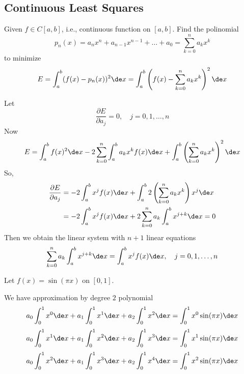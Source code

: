 \subsection{Continuous Least Squares}

\begin{definition}
    Given $f \in C[a,b]$, i.e., continuous function on $[a,b]$. Find the polinomial \[
        p_n(x) = a_n x^n + a_{n-1} x^{n-1} + \dots + a_0 = \sum_{k=0}^n a_k x^k
    \]
    to minimize \[
        E = \int_a^b (f(x) - p_n(x))^2 \de x = \int_a^b \left(f(x) - \sum_{k=0}^n a_k x^k\right)^2 \de x
    \]
\end{definition}

Let \[
    \frac{\partial E}{\partial a_j} = 0, \quad j=0,1,\dots,n
\]
Now \[
    E = \int_a^b f(x)^2 \de x - 2 \sum_{k=0}^n \int_a^b a_k x^k f(x) \de x + \int_a^b \left(\sum_{k=0}^n a_k x^k\right)^2 \de x
\]
So, \begin{align*}
    \frac{\partial E}{\partial a_j} &= -2 \int_a^b x^j f(x) \de x + \int_a^b 2 \left(\sum_{k=0}^n a_k x^k\right) x^j \de x \\
    &= -2 \int_a^b x^j f(x) \de x + 2 \sum_{k=0}^n a_k \int_a^b x^{j+k} \de x = 0
\end{align*}
Then we obtain the linear system with $n+1$ linear equations \[
    \sum_{k=0}^n a_k \int_a^b x^{j+k} \de x = \int_a^b x^j f(x) \de x, \quad j=0,1,\dots,n
\]

\newpage
\begin{eg}
    Let $f(x) = \sin (\pi x)$ on $[0,1]$.
\end{eg}

We have approximation by degree $2$ polynomial \[
    a_0 \int_0^1 x^0 \de x + a_1 \int_0^1 x^1 \de x + a_2 \int_0^1 x^2 \de x = \int_0^1 x^0 \sin (\pi x) \de x
\]
\[
    a_0 \int_0^1 x^1 \de x + a_1 \int_0^1 x^2 \de x + a_2 \int_0^1 x^3 \de x = \int_0^1 x^1 \sin (\pi x) \de x
\]
\[
    a_0 \int_0^1 x^2 \de x + a_1 \int_0^1 x^3 \de x + a_2 \int_0^1 x^4 \de x = \int_0^1 x^2 \sin (\pi x) \de x
\]

